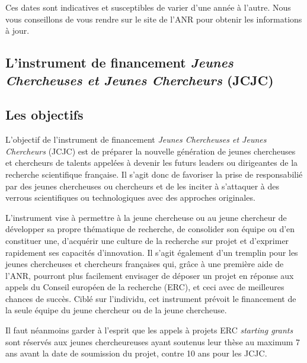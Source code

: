 Ces dates sont indicatives et susceptibles de varier d'une ann\'ee \`a l'autre. Nous vous conseillons de vous rendre sur le site de l'ANR pour obtenir les informations \`a jour.



\subsection{L'instrument de financement {\em Jeunes Chercheuses et Jeunes Chercheurs} (JCJC)}




\subsection*{Les objectifs}

L'objectif de l'instrument de financement {\em Jeunes Chercheuses et Jeunes Chercheurs} (JCJC) est de pr\'eparer la nouvelle g\'en\'eration de jeunes chercheuses et chercheurs de talents appel\'e\mp e\mp s \`a devenir les futurs leaders ou dirigeant\mp e\mp s de la recherche scientifique fran\c{c}aise. Il s'agit donc de favoriser la prise de responsabili\'e par des jeunes chercheuses ou chercheurs et de les inciter \`a s'attaquer \`a des verrous scientifiques ou technologiques avec des approches originales.

L'instrument vise \`a permettre \`a la jeune chercheuse ou au jeune chercheur de d\'evelopper sa propre th\'ematique de recherche, de consolider son
\'equipe ou d'en constituer une, d'acqu\'erir
une culture de la recherche sur projet et d'exprimer rapidement ses capacit\'es d'innovation. Il s'agit \'egalement d'un tremplin pour les jeunes chercheuses et
chercheurs fran\c{c}ais\mp e\mp s qui, gr\^ace \`a une premi\`ere aide de l'ANR, pourront plus facilement envisager de d\'eposer un projet en r\'eponse aux appels du Conseil europ\'een  de la recherche (ERC), et ceci avec de meilleures chances de succ\`es.
Cibl\'e sur l'individu, cet instrument pr\'evoit le financement de la
seule \'equipe du jeune chercheur ou de la jeune chercheuse.

Il faut n\'eanmoins garder \`a l'esprit que les appels \`a projets ERC \emph{starting grants} sont r\'eserv\'es aux jeunes chercheur\mp euse\mp s ayant soutenus leur th\`ese au maximum 7 ans avant la date de soumission du projet, contre 10 ans pour les JCJC.

